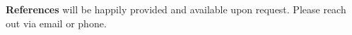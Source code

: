 \documentclass[10pt,a4paper,ragged2e,withhyper]{altacv}
\begin{document}
			\vspace{0.5em}
	
			
	\vspace{-1em}
	\divider\newline
	{\centering
	\textbf{References} will be happily provided and available upon request. Please reach out via email or phone.
	\par}

\end{document}
